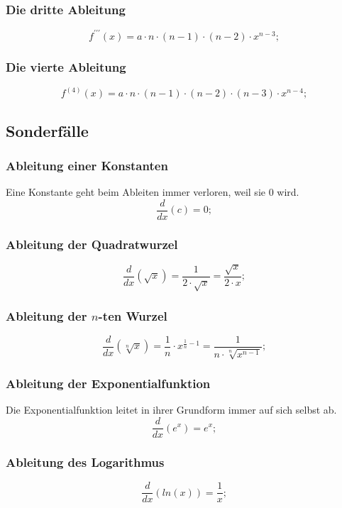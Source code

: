 \documentclass[a4paper]{article}
\begin{document}
\subsubsection{Die dritte Ableitung}
\[
	f^{\prime\prime\prime}(x) = a \cdot n \cdot \left( n - 1 \right) \cdot \left( n - 2 \right) \cdot x^{n-3} ;
\]

\subsubsection{Die vierte Ableitung}
\[
	f^{(4)}(x) = a \cdot n \cdot \left( n - 1 \right) \cdot \left( n - 2 \right) \cdot \left( n - 3 \right) \cdot x^{n - 4} ;
\]

\subsection{Sonderfälle}

\subsubsection{Ableitung einer Konstanten}
Eine Konstante geht beim Ableiten immer verloren, weil sie $0$ wird.
\[
	\frac{d}{dx} \left( c \right) = 0 ;
\]

\subsubsection{Ableitung der Quadratwurzel}
\[
	\frac{d}{dx} \left( \sqrt{x} \right) = \frac{1}{2 \cdot \sqrt{x}} = \frac{\sqrt{x}}{2 \cdot x} ;
\]

\subsubsection{Ableitung der $n$-ten Wurzel}
\[
	\frac{d}{dx} \left( \sqrt[n]{x} \right) = \frac{1}{n} \cdot x^{\frac{1}{n} - 1} = \frac{1}{n \cdot \sqrt[n]{x^{n - 1}}} ;
\]

\subsubsection{Ableitung der Exponentialfunktion}
Die Exponentialfunktion leitet in ihrer Grundform immer auf sich selbst ab.
\[
	\frac{d}{dx} \left( e^x \right) = e^x ;
\]

\subsubsection{Ableitung des Logarithmus}
\[
	\frac{d}{dx} \left( ln(x) \right) = \frac{1}{x} ;
\]
\end{document}
